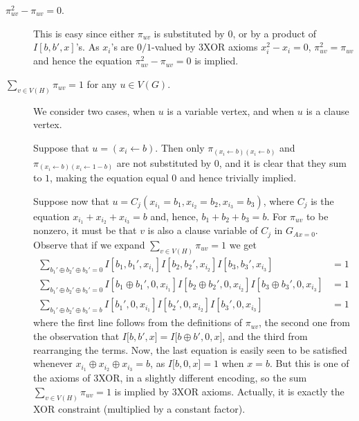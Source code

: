 \documentclass[a4paper,twoside,justified]{tufte-handout}
\begin{document}
\begin{description}
  \item[$\pi_{uv}^2-\pi_{uv}=0$.] This is easy since either $\pi_{uv}$ is substituted by $0$, or
    by a product of $I[b,b',x]$'s. As $x_i$'s are $0/1$-valued by 3XOR axioms $x_i^2 - x_i = 0$,
    $\pi_{uv}^2 = \pi_{uv}$ and hence the equation $\pi_{uv}^2-\pi_{uv}=0$ is implied.
  \item[$\sum_{v \in V(H)} \pi_{uv}=1$ for any $u \in V(G)$.] We consider two cases, when $u$ is a variable vertex,
    and when $u$ is a clause vertex.

    Suppose that $u=(x_i \leftarrow b)$. Then only $\pi_{(x_i \leftarrow b)(x_i \leftarrow b)}$
    and $\pi_{(x_i \leftarrow b)(x_i \leftarrow 1-b)}$ are not substituted by $0$, and it is clear that they sum to $1$, making the equation equal $0$ and hence trivially implied.

    Suppose now that $u=C_j(x_{i_1}=b_1,x_{i_2}=b_2,x_{i_3}=b_3)$,
    where $C_j$ is the equation $x_{i_1} + x_{i_2} + x_{i_3} = b$ 
    and, hence, $b_1 + b_2 + b_3 = b$. 
    For $\pi_{uv}$ to be nonzero, it
    must be that $v$ is also a clause variable of $C_j$ in $G_{A x = 0}$.  Observe that
    if we expand $\sum_{v \in V(H)} \pi_{u v} = 1$ we get
    \begin{align*}
      \sum_{b_1' \oplus b_2' \oplus b_3' = 0} I\left[b_1, b_1', x_{i_1}\right] I\left[b_2, b_2', x_{i_2}\right] I\left[b_3, b_3', x_{i_3}\right] &= 1 \\
      \sum_{b_1' \oplus b_2' \oplus b_3' = 0} I\left[b_1 \oplus b_1', 0, x_{i_1}\right] I\left[b_2 \oplus b_2', 0, x_{i_2}\right] I\left[b_3 \oplus b_3', 0, x_{i_3}\right] &= 1 \\
      \sum_{b_1' \oplus b_2' \oplus b_3' = b} I\left[b_1', 0, x_{i_1}\right] I\left[b_2', 0, x_{i_2}\right] I\left[b_3', 0, x_{i_3}\right] &= 1
    \end{align*}
    where the first line follows from the definitions of $\pi_{uv}$,
    the second one from the observation that $I\bigl[b, b', x\bigr] =
    I\bigl[b \oplus b', 0, x\bigr]$, and the third from rearranging
    the terms. Now, the last equation is easily seen to be satisfied
    whenever $x_{i_1} \oplus x_{i_2} \oplus x_{i_3} = b$, as
    $I\bigl[b, 0, x\bigr] = 1$ when $x = b$. But this is one of the
    axioms of 3XOR, in a slightly different encoding, so the sum 
    $\sum_{v \in V(H)} \pi_{uv}=1$ is implied by 3XOR axioms.
    Actually, it is exactly the XOR constraint (multiplied by a constant factor).


\end{description}
\end{document}

